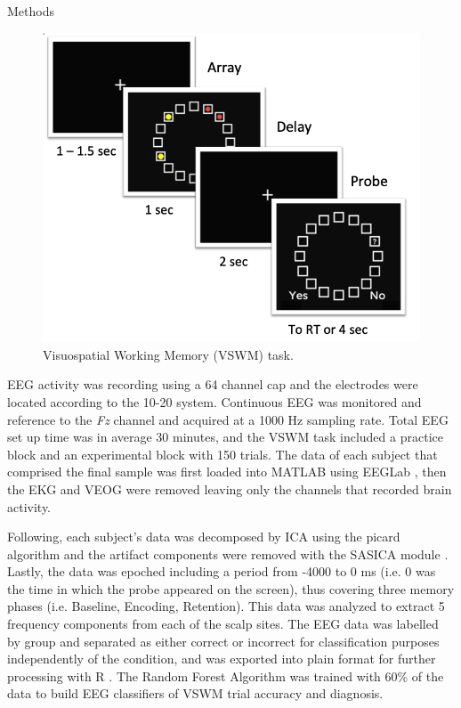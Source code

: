 \documentclass[final]{beamer}
\newlength{\colwidth}
\begin{document}
\begin{frame}[t]
\begin{columns}[t]
\begin{column}{\colwidth}
\begin{block}{Methods}
    \begin{figure}
      \centering
     \includegraphics[width=26cm]{img/VSWM_task.png} 
      \caption{Visuospatial Working Memory (VSWM) task.}
    \end{figure}


      EEG activity was recording using a 64 channel cap and the electrodes were located according to the 10-20 system. Continuous EEG was monitored and reference to the \textit{Fz} channel and acquired at a 1000 Hz sampling rate. Total EEG set up time was in average 30 minutes, and the VSWM task included a practice block and an experimental block with 150 trials. The data of each subject that comprised the final sample was first loaded into MATLAB using EEGLab \citep{delorme2004eeglab}, then the EKG and VEOG were removed leaving only the channels that recorded brain activity.

      Following, each subject's data was decomposed by ICA using the picard algorithm \citep{ablin2018faster} and the artifact components were removed with the SASICA module \citep{chaumon2015practical}. Lastly, the data was epoched including a period from -4000 to 0 ms (i.e. 0 was the time in which the probe appeared on the screen), thus covering three memory phases (i.e. Baseline, Encoding, Retention). This data was analyzed to extract 5 frequency components from each of the scalp sites. The EEG data was labelled by group and separated as either correct or incorrect for classification purposes independently of the condition, and was exported into plain format for further processing with R \citep{R-base}. The Random Forest Algorithm was trained with 60\% of the data to build EEG classifiers of VSWM trial accuracy and diagnosis.


\end{block}
\end{column}
\end{columns}
\end{frame}
\end{document}
